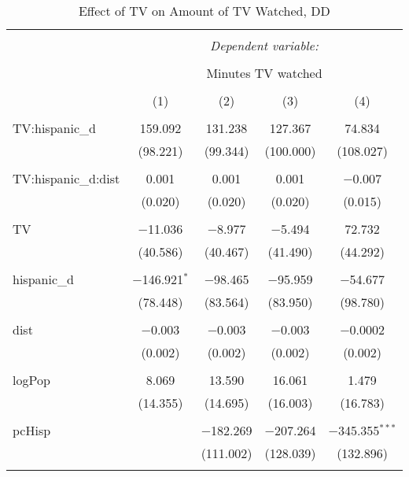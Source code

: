 
\begin{table}[!htbp] \centering 
  \caption{Effect of TV on Amount of TV Watched, DD} 
  \label{} 
\begin{tabular}{@{\extracolsep{-5pt}}lcccc} 
\\[-1.8ex]\hline 
\hline \\[-1.8ex] 
 & \multicolumn{4}{c}{\textit{Dependent variable:}} \\ 
\cline{2-5} 
\\[-1.8ex] & \multicolumn{4}{c}{Minutes TV watched} \\ 
\\[-1.8ex] & (1) & (2) & (3) & (4)\\ 
\hline \\[-1.8ex] 
 TV:hispanic\_d & 159.092 & 131.238 & 127.367 & 74.834 \\ 
  & (98.221) & (99.344) & (100.000) & (108.027) \\ 
  & & & & \\ 
 TV:hispanic\_d:dist & 0.001 & 0.001 & 0.001 & $-$0.007 \\ 
  & (0.020) & (0.020) & (0.020) & (0.015) \\ 
  & & & & \\ 
 TV & $-$11.036 & $-$8.977 & $-$5.494 & 72.732 \\ 
  & (40.586) & (40.467) & (41.490) & (44.292) \\ 
  & & & & \\ 
 hispanic\_d & $-$146.921$^{*}$ & $-$98.465 & $-$95.959 & $-$54.677 \\ 
  & (78.448) & (83.564) & (83.950) & (98.780) \\ 
  & & & & \\ 
 dist & $-$0.003 & $-$0.003 & $-$0.003 & $-$0.0002 \\ 
  & (0.002) & (0.002) & (0.002) & (0.002) \\ 
  & & & & \\ 
 logPop & 8.069 & 13.590 & 16.061 & 1.479 \\ 
  & (14.355) & (14.695) & (16.003) & (16.783) \\ 
  & & & & \\ 
 pcHisp &  & $-$182.269 & $-$207.264 & $-$345.355$^{***}$ \\ 
  &  & (111.002) & (128.039) & (132.896) \\ 
  & & & & \\ 

\end{tabular}
\end{table}
